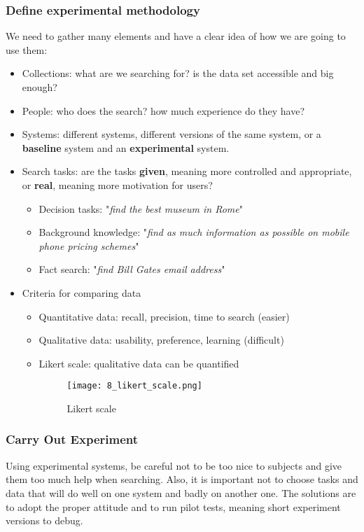 \documentclass{article}
\begin{document}
\subsubsection{Define experimental methodology}
We need to gather many elements and have a clear idea of how we are going to use them:
\begin{itemize}
    \item Collections: what are we searching for? is the data set accessible and big enough?
    \item People: who does the search? how much experience do they have?
    \item Systems: different systems, different versions of the same system, or a \textbf{baseline} system and an \textbf{experimental} system.
    \item Search tasks: are the tasks \textbf{given}, meaning more controlled and appropriate, or \textbf{real}, meaning more motivation for users?
        \begin{itemize}
            \item Decision tasks: "\textit{find the best museum in Rome}"
            \item Background knowledge: "\textit{find as much information as possible on mobile phone pricing schemes}"
            \item Fact search: "\textit{find Bill Gates email address}"
        \end{itemize}
    \item Criteria for comparing data
        \begin{itemize}
            \item Quantitative data: recall, precision, time to search (easier)
            \item Qualitative data: usability, preference, learning (difficult)
            \item Likert scale: qualitative data can be quantified
                \begin{figure}[H]
                    \centering
                    \texttt{[image: 8\_likert\_scale.png]}
                    \caption{Likert scale}
                \end{figure}
        \end{itemize}
\end{itemize}

\subsubsection{Carry Out Experiment}
Using experimental systems, be careful not to be too nice to subjects and give them too much help when searching. Also, it is important not to choose tasks and data that will do well on one system and badly on another one. The solutions are to adopt the proper attitude and to run pilot tests, meaning short experiment versions to debug.
\end{document}
